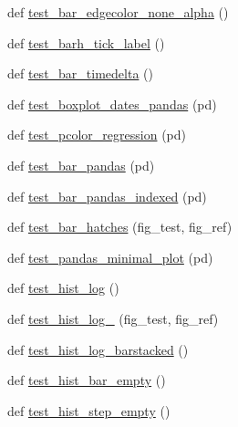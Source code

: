 \begin{DoxyCompactItemize}
\item 
def \hyperlink{namespacematplotlib_1_1tests_1_1test__axes_aca8bb3c12605bd0613284908b4c7f596}{test\+\_\+bar\+\_\+edgecolor\+\_\+none\+\_\+alpha} ()
\item 
def \hyperlink{namespacematplotlib_1_1tests_1_1test__axes_ac1455f82f6bddd751c619a3e82b5151d}{test\+\_\+barh\+\_\+tick\+\_\+label} ()
\item 
def \hyperlink{namespacematplotlib_1_1tests_1_1test__axes_ac566125491a4e0567d086e018248c6da}{test\+\_\+bar\+\_\+timedelta} ()
\item 
def \hyperlink{namespacematplotlib_1_1tests_1_1test__axes_a8170eed056f722d5e2a21d6cbdeab973}{test\+\_\+boxplot\+\_\+dates\+\_\+pandas} (pd)
\item 
def \hyperlink{namespacematplotlib_1_1tests_1_1test__axes_a248c3600c7eda56480ca878224dbf448}{test\+\_\+pcolor\+\_\+regression} (pd)
\item 
def \hyperlink{namespacematplotlib_1_1tests_1_1test__axes_a1156a804d73f6c86634313f257337831}{test\+\_\+bar\+\_\+pandas} (pd)
\item 
def \hyperlink{namespacematplotlib_1_1tests_1_1test__axes_ae62fc3d70b93d2613358fd1208606541}{test\+\_\+bar\+\_\+pandas\+\_\+indexed} (pd)
\item 
def \hyperlink{namespacematplotlib_1_1tests_1_1test__axes_a1ead52fe56f9561a169ac9b98fae1d20}{test\+\_\+bar\+\_\+hatches} (fig\+\_\+test, fig\+\_\+ref)
\item 
def \hyperlink{namespacematplotlib_1_1tests_1_1test__axes_ada312dff5f9152fbb3765f4d68f0ed16}{test\+\_\+pandas\+\_\+minimal\+\_\+plot} (pd)
\item 
def \hyperlink{namespacematplotlib_1_1tests_1_1test__axes_a3360051dbfb933aa9798944dbce994b4}{test\+\_\+hist\+\_\+log} ()
\item 
def \hyperlink{namespacematplotlib_1_1tests_1_1test__axes_acd315a09b980da06357f8d450a658a8c}{test\+\_\+hist\+\_\+log\+\_} (fig\+\_\+test, fig\+\_\+ref)
\item 
def \hyperlink{namespacematplotlib_1_1tests_1_1test__axes_a9adafdac01caf42993cb5cd5e547dcb7}{test\+\_\+hist\+\_\+log\+\_\+barstacked} ()
\item 
def \hyperlink{namespacematplotlib_1_1tests_1_1test__axes_af066fb225e22ffa05b03a7bd472cc0d9}{test\+\_\+hist\+\_\+bar\+\_\+empty} ()
\item 
def \hyperlink{namespacematplotlib_1_1tests_1_1test__axes_a2ab5e0a09f393f8ea055e190d65df190}{test\+\_\+hist\+\_\+step\+\_\+empty} ()
\item 

\end{DoxyCompactItemize}
